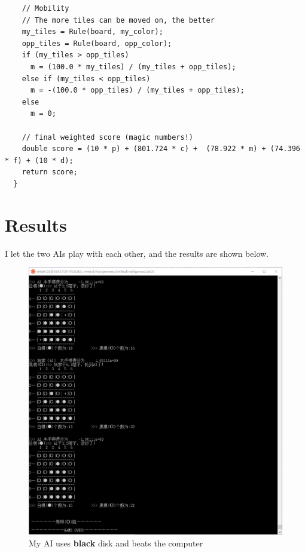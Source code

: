 ﻿\documentclass[a4paper, 11pt]{article}
\begin{document}
\begin{lstlisting}
    // Mobility
    // The more tiles can be moved on, the better
    my_tiles = Rule(board, my_color);
    opp_tiles = Rule(board, opp_color);
    if (my_tiles > opp_tiles)
      m = (100.0 * my_tiles) / (my_tiles + opp_tiles);
    else if (my_tiles < opp_tiles)
      m = -(100.0 * opp_tiles) / (my_tiles + opp_tiles);
    else
      m = 0;

    // final weighted score (magic numbers!)
    double score = (10 * p) + (801.724 * c) +  (78.922 * m) + (74.396 * f) + (10 * d);
    return score;
  }
\end{lstlisting}

\section{Results}
I let the two AIs play with each other, and the results are shown below.
\begin{figure}[H]
  \centering
  \includegraphics[width=\linewidth]{fig/black.png}
  \caption{My AI uses \textbf{black} disk and beats the computer}
\end{figure}
\end{document}
